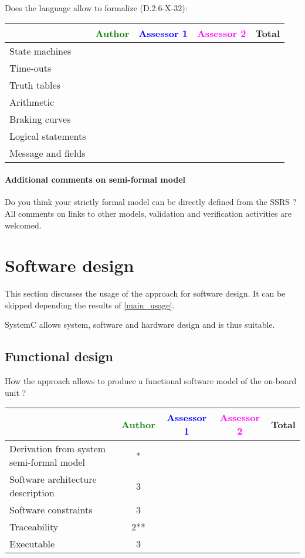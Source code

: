 Does the language allow to  formalize (D.2.6-X-32):

\begin{tabular}{|l | c | c | c | c|}
\hline
& \textcolor{green}{Author} & \textcolor{blue}{Assessor 1} & \textcolor{magenta}{Assessor 2} & Total \\
\hline 
State machines  & & & &  \\
\hline
Time-outs  & & & &  \\
\hline
Truth tables  & & & &  \\
\hline
Arithmetic  & & & &  \\
\hline
Braking curves  & & & &  \\
\hline
Logical statements & & & &  \\
\hline
Message and fields & & & &  \\
\hline
\end{tabular}

\paragraph{Additional comments on semi-formal  model} Do you think your strictly formal  model can be directly defined from the SSRS ?
All comments on links to  other models, validation and verification activities are welcomed.


\section{Software design}
This section discusses the usage of the approach for software design.
It can be skipped depending the results of \ref{main_usage}.

\begin{author_comment}
SystemC allows system, software and hardware design and is thus suitable.
\end{author_comment}

\subsection{Functional design}

How the approach allows to  produce a functional software model of the on-board unit ?

\begin{tabular}{|l | c | c | c | c|}
\hline
& \textcolor{green}{Author} & \textcolor{blue}{Assessor 1} & \textcolor{magenta}{Assessor 2} & Total \\
\hline
Derivation from system semi-formal model  &* & & &  \\
\hline 
Software architecture description  &3 & & &  \\
\hline
Software constraints  &3 & & &  \\
\hline
Traceability  &2** & & &  \\
\hline
Executable  &3 & & &  \\
\hline
\end{tabular}

